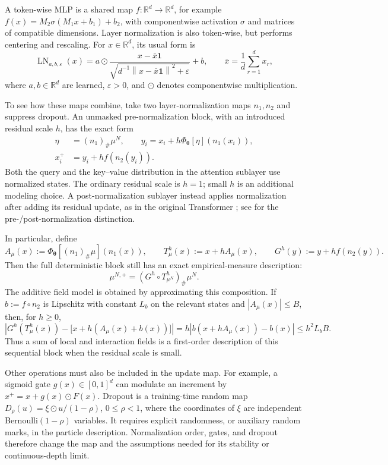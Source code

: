 \documentclass[11pt]{amsart}
\numberwithin{equation}{section}
\theoremstyle{plain}
\newcommand{\R}{\mathbb{R}}
\newcommand{\abs}[1]{\left\lvert#1\right\rvert}
\newcommand{\norm}[1]{\left\lVert#1\right\rVert}
\begin{document}
A token-wise MLP is a shared map $f:\R^d\to\R^d$, for example
$f(x)=M_2\sigma(M_1x+b_1)+b_2$, with componentwise activation $\sigma$ and
matrices of compatible dimensions.  Layer normalization is also token-wise, but
performs centering and rescaling.  For $x\in\R^d$, its usual form is
\[
 \operatorname{LN}_{a,b,\varepsilon}(x)
 =a\odot
 \frac{x-\bar x\mathbf 1}
 {\sqrt{d^{-1}\norm{x-\bar x\mathbf 1}^2+\varepsilon}}+b,
 \qquad
 \bar x=\frac1d\sum_{r=1}^d x_r,
\]
where $a,b\in\R^d$ are learned, $\varepsilon>0$, and $\odot$ denotes
componentwise multiplication.

To see how these maps combine, take two layer-normalization maps $n_1,n_2$
and suppress dropout.  An unmasked pre-normalization block, with an introduced
residual scale $h$, has the exact form
\begin{equation}\label{eq:attention-composed-block}
 \begin{split}
  \eta&=(n_1)_\#\mu^N,\qquad
  y_i=x_i+h\Phi_{\boldsymbol\theta}[\eta](n_1(x_i)),\\
  x_i^+&=y_i+h f(n_2(y_i)).
 \end{split}
\end{equation}
Both the query and the key--value distribution in the attention sublayer
use normalized states.  The ordinary residual scale is $h=1$; small $h$ is
an additional modeling choice.  A post-normalization sublayer instead applies
normalization after adding its residual update, as in the original
Transformer \cite{VaswaniEtAl2017}; see \cite{XiongEtAl2020} for the
pre-/post-normalization distinction.

In particular, define
\[
 A_\mu(x):=\Phi_{\boldsymbol\theta}[(n_1)_\#\mu](n_1(x)),\qquad
 T_\mu^h(x):=x+hA_\mu(x),\qquad G^h(y):=y+h f(n_2(y)).
\]
Then the full deterministic block still has an exact empirical-measure
description:
\[
 \mu^{N,+}=(G^h\circ T_{\mu^N}^h)_\#\mu^N.
\]
The additive field model is obtained by approximating this composition.  If
$b:=f\circ n_2$ is Lipschitz with constant $L_b$ on the relevant states and
$\abs{A_\mu(x)}\leq B$, then, for $h\geq0$,
\[
 \abs{G^h(T_\mu^h(x))-\bigl[x+h(A_\mu(x)+b(x))\bigr]}
 =h\abs{b(x+hA_\mu(x))-b(x)}\leq h^2L_bB.
\]
Thus a sum of local and interaction fields is a first-order description of
this sequential block when the residual scale is small.

Other operations must also be included in the update map.  For example, a
sigmoid gate $g(x)\in[0,1]^d$ can modulate an increment by
$x^+=x+g(x)\odot F(x)$.  Dropout is a training-time random map
$D_\rho(u)=\xi\odot u/(1-\rho)$, $0\leq\rho<1$, where the coordinates of
$\xi$ are independent Bernoulli$(1-\rho)$ variables.  It requires explicit
randomness, or auxiliary random marks, in the particle description.
Normalization order, gates, and dropout therefore change the map and the
assumptions needed for its stability or continuous-depth limit.
\end{document}
